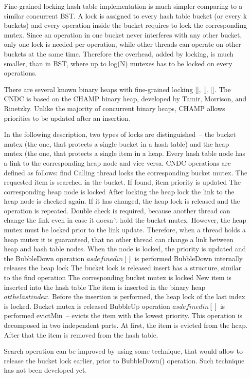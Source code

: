 Fine-grained locking hash table implementation is much simpler comparing to a similar concurrent BST. A lock is assigned to every hash table bucket (or every k buckets) and every operation inside the bucket requires to lock the corresponding mutex. Since an operation in one bucket never interferes with any other bucket, only one lock is needed per operation, while other threads can operate on other buckets at the same time. Therefore the overhead, added by locking, is much smaller, than in BST, where up to log(N) mutexes has to be locked on every operations.

There are several known binary heaps with fine-grained locking [], [], []. The CNDC is based on the CHAMP binary heap, developed by Tamir, Morrison, and Rinetzky. Unlike the majority of concurrent binary heaps, CHAMP allows priorities to be updated after an insertion.

In the following description, two types of locks are distinguished~-- the bucket mutex (the one, that protects a single bucket in a hash table) and the heap mutex (the one, that protects a single item in a heap. Every hash table node has a link to the corresponding heap node and vice versa. CNDC operations are defined as follows:
find
Calling thread locks the corresponding bucket mutex.
The requested item is searched in the bucket.
If found, item priority is updated
The corresponding heap node is locked
After locking the heap lock the link to the heap node is checked again. If it has changed, the heap lock is released and the operation is repeated. Double check is required, because another thread can change the link even in case it doesn’t hold the bucket mutex. However, the heap mutex must be locked prior to the link update. Therefore, when a thread holds a heap mutex it is guaranteed, that no other thread can change a link between heap and hash table nodes.
When the node is locked, the priority is updated and the BubbleDown operation \(as defined in []\) is performed
BubbleDown internally releases the heap lock
The bucket lock is released
insert has a structure, similar to the find operation
The corresponding bucket mutex is locked
New item is inserted into the hash table
The item is inserted in the binary heap \(at the last index\). Before the insertion is performed, the heap lock of the last index is locked.
Bucket mutex is released
BubbleUp operation \(as defined in []\) is performed
evictMin\(\)~-- evicts the item with the lowest priority. This operation is decomposed in two independent parts.
At first, the item is evicted from the heap.
After that the item is removed from the hash table.

Search operation can be improved by using some technique, that would allow to release the bucket lock earlier, prior to BubbleDown() operation. Such technique has not been developed yet.

